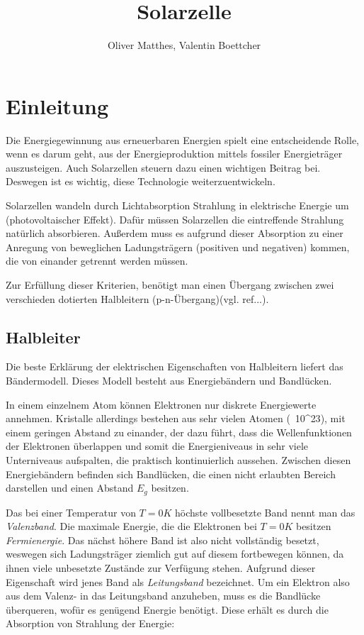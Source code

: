 \documentclass[slug=SZ, room=Hermann-Krone-Bau\,\ Labor\ 1.25, supervisor=Tim\ Ziegler]{../../Lab_Report_LaTeX/lab_report}
\title{Solarzelle}
\author{Oliver Matthes, Valentin Boettcher}
\begin{document}
\maketitle

\section{Einleitung}
\label{sec:einl}

Die Energiegewinnung aus erneuerbaren Energien spielt eine entscheidende Rolle, wenn es darum geht,
aus der Energieproduktion mittels fossiler Energieträger auszusteigen.
Auch Solarzellen steuern dazu einen wichtigen Beitrag bei. Deswegen ist es wichtig, diese
Technologie weiterzuentwickeln.

Solarzellen wandeln durch Lichtabsorption Strahlung in elektrische Energie um (photovoltaischer Effekt).
Dafür müssen Solarzellen die eintreffende Strahlung natürlich absorbieren. 
Außerdem muss es aufgrund dieser Absorption zu einer Anregung von beweglichen Ladungsträgern
(positiven und negativen) kommen, die von einander getrennt werden müssen.

Zur Erfüllung dieser Kriterien, benötigt man einen Übergang zwischen zwei verschieden dotierten
Halbleitern (p-n-Übergang)(vgl. ref...).

\subsection{Halbleiter}
\label{sec:halbleiter}

Die beste Erklärung der elektrischen Eigenschaften von Halbleitern liefert das Bändermodell.
Dieses Modell besteht aus Energiebändern und Bandlücken.

In einem einzelnem Atom können Elektronen nur diskrete Energiewerte annehmen.
Kristalle allerdings bestehen aus sehr vielen Atomen (~10^{23}), mit einem geringen Abstand zu einander,
der dazu führt, dass die Wellenfunktionen der Elektronen überlappen und somit die Energieniveaus in sehr
viele Unterniveaus aufspalten, die praktisch kontinuierlich aussehen.
Zwischen diesen Energiebändern befinden sich Bandlücken, die einen nicht erlaubten Bereich darstellen und
einen Abstand $ \mathit{E_g} $ besitzen.

Das bei einer Temperatur von $ T=0 K $ höchste vollbesetzte Band nennt man das \emph{Valenzband}.
Die maximale Energie, die die Elektronen bei $ T=0 K $ besitzen \emph{Fermienergie}. Das nächst höhere Band ist
also nicht vollständig besetzt, weswegen sich Ladungsträger ziemlich gut auf diesem fortbewegen können, da
ihnen viele unbesetzte Zustände zur Verfügung stehen.
Aufgrund dieser Eigenschaft wird jenes Band als \emph{Leitungsband} bezeichnet.
Um ein Elektron also aus dem Valenz- in das Leitungsband anzuheben, muss es die Bandlücke überqueren,
wofür es genügend Energie benötigt. Diese erhält es durch die Absorption von Strahlung der Energie:
\end{document}
